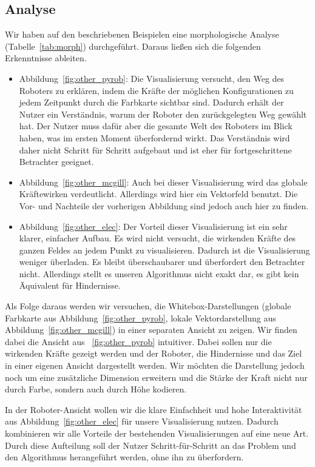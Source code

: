 \subsection{Analyse}
Wir haben auf den beschriebenen Beispielen eine morphologische Analyse (Tabelle~\vref{tab:morph}) durchgeführt. Daraus ließen sich die folgenden Erkenntnisse ableiten.
\begin{itemize}
    \item Abbildung~\vref{fig:other_pyrob}: Die Visualisierung versucht, den Weg des Roboters zu erklären, indem die Kräfte der möglichen Konfigurationen zu jedem Zeitpunkt durch die Farbkarte sichtbar sind. Dadurch erhält der Nutzer ein Verständnis, warum der Roboter den zurückgelegten Weg gewählt hat. Der Nutzer muss dafür aber die gesamte Welt des Roboters im Blick haben, was im ersten Moment überfordernd wirkt. Das Verständnis wird daher nicht Schritt für Schritt aufgebaut und ist eher für fortgeschrittene Betrachter geeignet.
    \item Abbildung~\vref{fig:other_mcgill}: Auch bei dieser Visualisierung wird das globale Kräftewirken verdeutlicht. Allerdings wird hier ein Vektorfeld benutzt. Die Vor- und Nachteile der vorherigen Abbildung sind jedoch auch hier zu finden. 
    \item Abbildung~\vref{fig:other_elec}: Der Vorteil dieser Visualisierung ist ein sehr klarer, einfacher Aufbau. Es wird nicht versucht, die wirkenden Kräfte des ganzen Feldes an jedem Punkt zu visualisieren. Dadurch ist die Visualisierung weniger überladen. Es bleibt überschaubarer und überfordert den Betrachter nicht. Allerdings stellt es unseren Algorithmus nicht exakt dar, es gibt kein Äquivalent für Hindernisse.
\end{itemize}

Als Folge daraus werden wir versuchen, die Whitebox-Darstellungen (globale Farbkarte aus Abbildung~\vref{fig:other_pyrob}, lokale Vektordarstellung aus Abbildung~\vref{fig:other_mcgill}) in einer separaten Ansicht zu zeigen. 
Wir finden dabei die Ansicht aus ~\vref{fig:other_pyrob} intuitiver. 
Dabei sollen nur die wirkenden Kräfte gezeigt werden und der Roboter, die Hindernisse und das Ziel in einer eigenen Ansicht dargestellt werden.
Wir möchten die Darstellung jedoch noch um eine zusätzliche Dimension erweitern und die Stärke der Kraft nicht nur durch Farbe, sondern auch durch Höhe kodieren.

In der Roboter-Ansicht wollen wir die klare Einfachheit und hohe Interaktivität aus Abbildung~\vref{fig:other_elec} für unsere Visualisierung nutzen. Dadurch kombinieren wir alle Vorteile der bestehenden Visualisierungen auf eine neue Art.
Durch diese Aufteilung soll der Nutzer Schritt-für-Schritt an das Problem und den Algorithmus herangeführt werden, ohne ihn zu überfordern.

